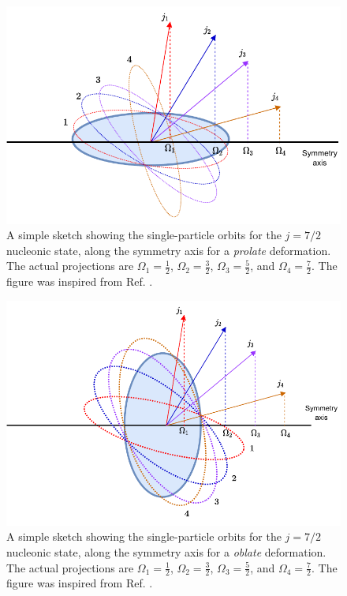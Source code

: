 \begin{figure}
    \centering
    \includegraphics[scale=1]{Chapters/Figures/nillson_SP_orbits.pdf}
    \caption{A simple sketch showing the single-particle orbits for the $j=7/2$ nucleonic state, along the symmetry axis for a \emph{prolate} deformation. The actual projections are $\Omega_1=\frac{1}{2}$, $\Omega_2=\frac{3}{2}$, $\Omega_3=\frac{5}{2}$, and $\Omega_4=\frac{7}{2}$. The figure was inspired from Ref. \cite{krane1991introductory}.}
    \label{nillson-orbits-prolate-projections}
\end{figure}

\begin{figure}
    \centering
    \includegraphics[scale=1]{Chapters/Figures/nillson_SP_orbits_2.pdf}
    \caption{A simple sketch showing the single-particle orbits for the $j=7/2$ nucleonic state, along the symmetry axis for a \emph{oblate} deformation. The actual projections are $\Omega_1=\frac{1}{2}$, $\Omega_2=\frac{3}{2}$, $\Omega_3=\frac{5}{2}$, and $\Omega_4=\frac{7}{2}$. The figure was inspired from Ref. \cite{krane1991introductory}.}
    \label{nillson-orbits-oblate-projections}
\end{figure}

